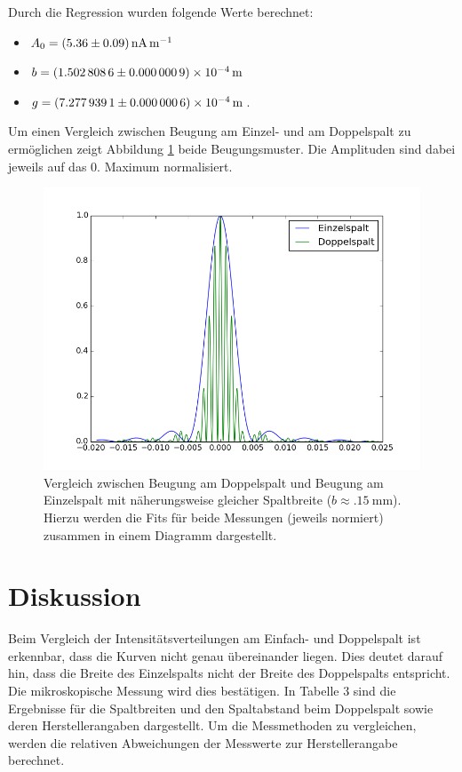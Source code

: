 \documentclass[11pt,ngerman,a4paper]{article}
\begin{document}
Durch die Regression wurden folgende Werte berechnet:
\begin{itemize}
\item $A_0 = \SI{5.36+-0.09}{\nano\ampere\per\meter}$
\item $b = \SI{1.5028086+-0.0000009e-4}{\meter}$
\item $g = \SI{7.2779391+-0.0000006e-4}{\meter}$.
\end{itemize}
Um einen Vergleich zwischen Beugung am Einzel- und am Doppelspalt zu ermöglichen zeigt Abbildung \ref{plot3} beide Beugungsmuster. Die Amplituden sind dabei jeweils auf das 0. Maximum normalisiert.
\begin{figure}[htp]
\centering
\includegraphics[scale=0.8]{plot4.png}
\caption{Vergleich zwischen Beugung am Doppelspalt und Beugung am Einzelspalt mit näherungsweise gleicher Spaltbreite ($b \approx \SI{.15}{\milli\meter}$). Hierzu werden die Fits für beide Messungen (jeweils normiert) zusammen in einem Diagramm dargestellt.}
\label{plot3}
\end{figure}

\section{Diskussion}

Beim Vergleich der Intensitätsverteilungen am Einfach- und Doppelspalt ist erkennbar, dass die Kurven nicht genau übereinander liegen. Dies deutet darauf hin, dass die Breite des Einzelspalts nicht der Breite des Doppelspalts entspricht. Die mikroskopische Messung wird dies bestätigen. In Tabelle 3 sind die Ergebnisse für die Spaltbreiten und den Spaltabstand beim Doppelspalt sowie deren Herstellerangaben dargestellt. Um die Messmethoden zu vergleichen, werden die relativen Abweichungen der Messwerte zur Herstellerangabe berechnet.
\end{document}
